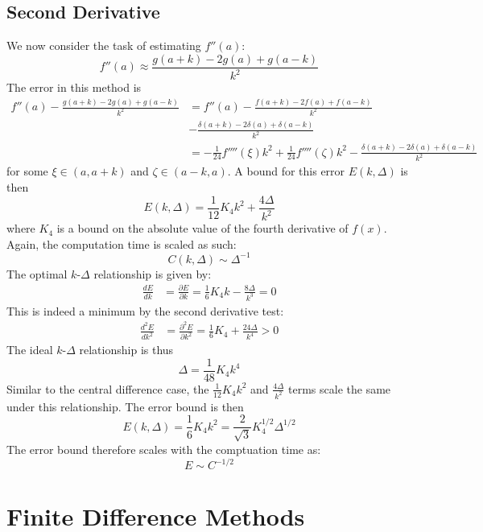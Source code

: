 \documentclass[letterpaper,11pt]{article}
\newcommand*{\deriv}[2]{\frac{d #1}{d #2}}
\newcommand*{\pderiv}[2]{\frac{\partial #1}{\partial #2}}
\newcommand*{\nderiv}[3]{\frac{d^{#3} #1}{d #2^{#3}}}
\newcommand*{\npderiv}[3]{\frac{\partial^{#3} #1}{\partial #2^{#3}}}
\begin{document}
\begin{flushleft}
    \subsection{Second Derivative}
    We now consider the task of estimating $f''(a)$:
    $$f''(a) \approx \frac{g(a+k) - 2g(a) + g(a-k)}{k^2}$$
    The error in this method is
    \begin{align*}
        f''(a) - \frac{g(a+k) - 2g(a) + g(a-k)}{k^2} &= f''(a) - \frac{f(a+k) - 2f(a) + f(a-k)}{k^2} \\ &- \frac{\delta(a+k) - 2\delta(a) + \delta(a-k)}{k^2} \\
        &= -\frac{1}{24}f''''(\xi)k^2 + \frac{1}{24}f''''(\zeta)k^2 - \frac{\delta(a+k) - 2\delta(a) + \delta(a-k)}{k^2}
    \end{align*}
    for some $\xi \in (a, a+k)$ and $\zeta \in (a-k, a)$. A bound for this error $E(k, \Delta)$ is then
    $$E(k, \Delta) = \frac{1}{12}K_4k^2 + \frac{4\Delta}{k^2}$$
    where $K_4$ is a bound on the absolute value of the fourth derivative of $f(x)$. Again, the computation time is scaled as such:
    $$\boxed{C(k, \Delta) \sim \Delta^{-1}}$$
    The optimal $k$-$\Delta$ relationship is given by:
    \begin{align*}
        \deriv{E}{k} &= \pderiv{E}{k} = \frac{1}{6}K_4k - \frac{8\Delta}{k^3} = 0
    \end{align*}
    This is indeed a minimum by the second derivative test:
    \begin{align*}
        \nderiv{E}{k}{2} &= \npderiv{E}{k}{2} = \frac{1}{6}K_4 + \frac{24\Delta}{k^4} > 0
    \end{align*}
    The ideal $k$-$\Delta$ relationship is thus
    $$\boxed{\Delta = \frac{1}{48}K_4k^4}$$
    Similar to the central difference case, the $\frac{1}{12}K_4k^2$ and $\frac{4\Delta}{k^2}$ terms scale the same under this relationship. The error bound is then
    $$\boxed{E(k, \Delta) = \frac{1}{6}K_4k^2 = \frac{2}{\sqrt{3}}K_4^{1/2}\Delta^{1/2}}$$
    The error bound therefore scales with the comptuation time as:
    $$\boxed{E \sim C^{-1/2}}$$

    \section{Finite Difference Methods}


\end{flushleft}
\end{document}
